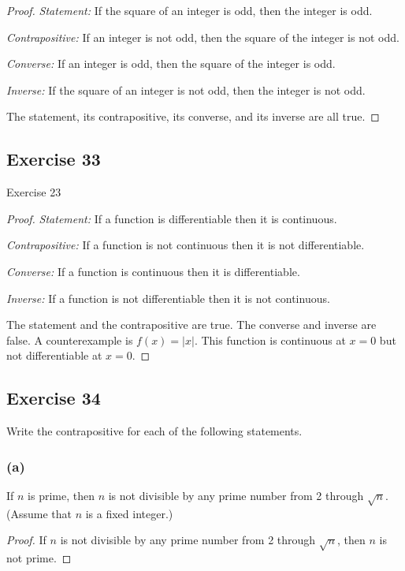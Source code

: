 \documentclass[14pt]{extarticle}
\begin{document}
\begin{proof}
{\it Statement:} If the square of an integer is odd, then the integer is odd.

{\it Contrapositive:} If an integer is not odd, then the square of the integer is not odd.

{\it Converse:} If an integer is odd, then the square of the integer is odd.

{\it Inverse:} If the square of an integer is not odd, then the integer is not odd.

The statement, its contrapositive, its converse, and its
inverse are all true.
\end{proof}

\subsection{Exercise 33}
Exercise 23

\begin{proof}
{\it Statement:} If a function is differentiable then it is continuous.

{\it Contrapositive:} If a function is not continuous then it is not differentiable.

{\it Converse:} If a function is continuous then it is differentiable.

{\it Inverse:} If a function is not differentiable then it is not continuous.

The statement and the contrapositive are true. The converse and inverse are false. A counterexample is $f(x) = |x|$. This function is continuous at $x = 0$ but not differentiable at $x = 0$.
\end{proof}

\subsection{Exercise 34}
Write the contrapositive for each of the following statements.

\subsubsection{(a)}
If $n$ is prime, then $n$ is not divisible by any prime number from 2 through $\sqrt{n}$. (Assume that $n$ is a fixed integer.)

\begin{proof}
If $n$ is not divisible by any prime number from 2 through $\sqrt{n}$, then $n$ is not prime. 
\end{proof}
\end{document}

